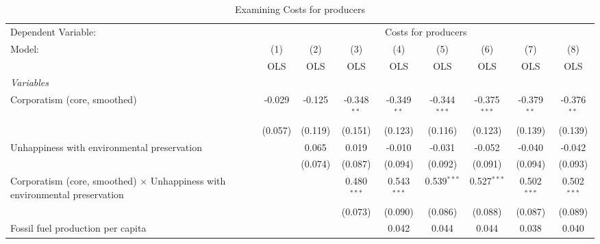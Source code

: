 
\begin{table}[htbp]
   \caption{Examining Costs for producers}
   \centering
   \begin{tabular}{lcccccccc}
      \toprule
      Dependent Variable: & \multicolumn{8}{c}{Costs for producers}\\
      Model:                                                                             & (1)     & (2)     & (3)           & (4)           & (5)            & (6)            & (7)           & (8)\\  
                                                                                         &  OLS    & OLS     & OLS           & OLS           & OLS            & OLS            & OLS           & OLS\\  
      \midrule
      \emph{Variables}\\
      Corporatism (core, smoothed)                                                       & -0.029  & -0.125  & -0.348$^{**}$ & -0.349$^{**}$ & -0.344$^{***}$ & -0.375$^{***}$ & -0.379$^{**}$ & -0.376$^{**}$\\   
                                                                                         & (0.057) & (0.119) & (0.151)       & (0.123)       & (0.116)        & (0.123)        & (0.139)       & (0.139)\\   
      Unhappiness with environmental preservation                                        &         & 0.065   & 0.019         & -0.010        & -0.031         & -0.052         & -0.040        & -0.042\\   
                                                                                         &         & (0.074) & (0.087)       & (0.094)       & (0.092)        & (0.091)        & (0.094)       & (0.093)\\   
      Corporatism (core, smoothed) $\times$ Unhappiness with environmental preservation  &         &         & 0.480$^{***}$ & 0.543$^{***}$ & 0.539$^{***}$  & 0.527$^{***}$  & 0.502$^{***}$ & 0.502$^{***}$\\   
                                                                                         &         &         & (0.073)       & (0.090)       & (0.086)        & (0.088)        & (0.087)       & (0.089)\\   
      Fossil fuel production per capita                                                  &         &         &               & 0.042         & 0.044          & 0.044          & 0.038         & 0.040\\   

\end{tabular}
\end{table}
